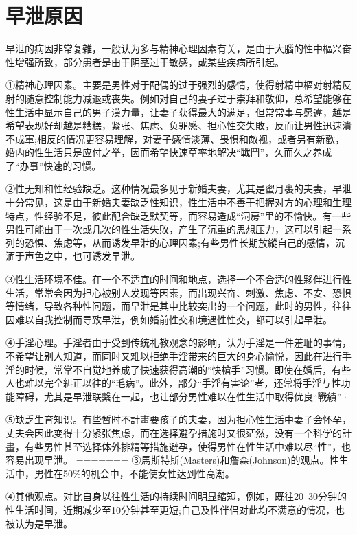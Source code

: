 \documentclass[12pt,UTF8]{ctexbook}
\begin{document}
\section{早泄原因}

早泄的病因非常复雜，一般认为多与精神心理因素有关，是由于大腦的性中樞兴奋性增强所致，部分患者是由于阴茎过于敏感，或某些疾病所引起。

①精神心理因素。主要是男性对于配偶的过于强烈的感情，使得射精中樞对射精反射的随意控制能力减退或丧失。例如对自己的妻子过于崇拜和敬仰，总希望能够在性生活中显示自己的男子漢力量，让妻子获得最大的满足，但常常事与愿違，越是希望表现好却越是糟糕，紧张、焦虑、负罪感、担心性交失敗，反而让男性迅速潰不成軍;相反的情况更容易理解，对妻子感情淡薄、畏惧和敵视，或者另有新歡，婚内的性生活只是应付之举，因而希望快速草率地解决“戰鬥”，久而久之养成了“办事”快速的习惯。

②性无知和性经验缺乏。这种情况最多见于新婚夫妻，尤其是蜜月裹的夫妻，早泄十分常见，这是由于新婚夫妻缺乏性知识，性生活中不善于把握对方的心理和生理特点，性经验不足，彼此配合缺乏默契等，而容易造成“洞房”里的不愉快。有一些男性可能由于一次或几次的性生活失敗，产生了沉重的思想压力，这可以引起一系列的恐惧、焦虑等，从而诱发早泄的心理因素;有些男性长期放縱自己的感情，沉湎于声色之中，也可诱发早泄。

③性生活环境不佳。在一个不适宜的时间和地点，选择一个不合适的性夥伴进行性生活，常常会因为担心被别人发现等因素，而出现兴奋、刺激、焦虑、不安、恐惧等情绪，导致各种性问题，而早泄是其中比较突出的一个问题，此时的男性，往往因难以自我控制而导致早泄，例如婚前性交和境遇性性交，都可以引起早泄。

④手淫心理。手淫者由于受到传统礼教观念的影响，认为手淫是一件羞耻的事情，不希望让别人知道，而同时又难以拒绝手淫带来的巨大的身心愉悦，因此在进行手淫的时候，常常不自觉地养成了快速获得高潮的“快槍手”习惯。即使在婚后，有些人也难以完全糾正以往的“毛病”。此外，部分“手淫有害论”者，还常将手淫与性功能障碍，尤其是早泄联繫在一起，也让部分男性难以在性生活中取得优良“戰績”·

⑤缺乏生育知识。有些暂时不計畫要孩子的夫妻，因为担心性生活中妻子会怀孕，丈夫会因此变得十分紧张焦虑，而在选择避孕措施时又很茫然，没有一个科学的計畫，有些男性甚至选择体外排精等措施避孕，使得男性在性生活中难以尽“性”，也容易出现早泄。
=======
③馬斯特斯(Masters)和詹森(Johnson)的观点。性生活中，男性在50\%的机会中，不能使女性达到性高潮。

④其他观点。对比自身以往性生活的持续时间明显缩短，例如，既往20~30分钟的性生活时间，近期减少至10分钟甚至更短;自己及性伴侣对此均不满意的情况，也被认为是早泄。
\end{document}

